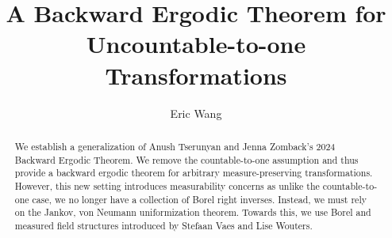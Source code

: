 \documentclass{article}
\theoremstyle{definition}
\begin{document}
\title{A Backward Ergodic Theorem for Uncountable-to-one Transformations}
\author{Eric Wang}
\date{}
\maketitle

\begin{abstract}
    \noindent We establish a generalization of Anush Tserunyan and Jenna Zomback's 2024 Backward Ergodic Theorem. We remove the countable-to-one assumption and thus provide a backward ergodic theorem for arbitrary measure-preserving transformations. However, this new setting introduces measurability concerns as unlike the countable-to-one case, we no longer have a collection of Borel right inverses. Instead, we must rely on the Jankov, von Neumann uniformization theorem. Towards this, we use Borel and measured field structures introduced by Stefaan Vaes and Lise Wouters.
\end{abstract}
\end{document}
